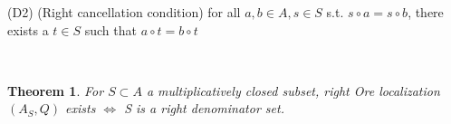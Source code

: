 \documentclass[12pt]{amsart}    %
\newtheorem{theorem}{Theorem}[section]
\theoremstyle{definition}
\begin{document}
(D2) (Right cancellation condition) for all $a, b \in A, s \in S$ s.t. $s \circ a = s \circ b$, there exists a $t \in S$ such that $a \circ t = b \circ t$

\begin{center}
\end{center}

\

\begin{theorem}
For $S \subset A$ a multiplicatively closed subset, right Ore localization $(A_S, Q)$ exists $\iff$ S is a right denominator set.  
\end{theorem}
\end{document}
